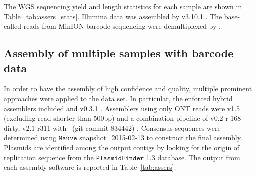 The WGS sequencing yield and length statistics for each sample are shown in Table~\ref{tab:assers_stats}. 
Illumina data was assembled by \spades{} v3.10.1 \cite{BankevichNA2012}.
The base-called reads from MinION barcode sequencing were demultiplexed by \npbarcode{}. 
\subsection{Assembly of multiple samples with barcode data}

In order to have the assembly of high confidence and quality, multiple prominent approaches were applied to the data set. 
In particular, the enforced hybrid assemblers included \npscarf{} and \unicycler{} v0.3.1 \cite{Wick2017unicycler}. Assemblers using only ONT reads were \canu{} v1.5 \cite{Koren2017canu} (excluding read shorter than 500bp) and a combination pipeline of \miniasm{} v0.2-r-168-dirty, \minimap{} v2.1-r311 with \racon{}~(git commit 834442) \cite{Vaser2017racon}. Consensus sequences were determined using $\mathtt{Mauve}$ \cite{Darling2011mauve} snapshot\_2015-02-13 to construct the final assembly. 
Plasmids are identified among the output contigs by looking for the origin of replication sequence from the $\mathtt{PlasmidFinder}$ 1.3 \cite{Carattoli2014} database.
The output from each assembly software is reported in Table~\ref{tab:assers}.


